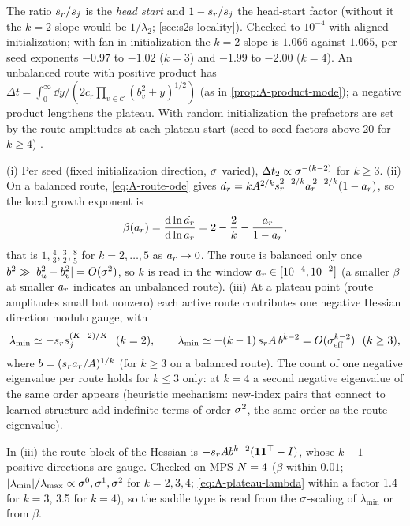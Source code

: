 The ratio $s_{r}/s_{j}$ is the \emph{head start} and $1-s_{r}/s_{j}$ the head-start factor (without it the $k=2$ slope
would be $1/\lambda_2$;
\cref{sec:s2s-locality}). Checked to $10^{-4}$ with aligned initialization; with fan-in initialization the $k=2$
slope is $1.066$ against $1.065$, per-seed exponents $-0.97$ to $-1.02$ ($k=3$) and $-1.99$ to $-2.00$ ($k=4$).
An unbalanced route with positive product has $\Delta t=\int_0^\infty\dd y/(2c_r\prod_{v\in\mathcal C}(b_v^2+y)^{1/2})$ \derived{}
(as in \cref{prop:A-product-mode}); a negative product lengthens the plateau. With random initialization the
prefactors are set by the route amplitudes at each plateau start (seed-to-seed factors above 20 for $k\ge4$) \empirical.

\begin{proposition}\label{prop:A-signatures}
  \derived{} 
  (i) Per seed (fixed initialization direction, $\sigma$ varied), $\Delta t_2\propto\sigma^{-(k-2)}$ for $k\ge3$.
  (ii) On a balanced route, \eqref{eq:A-route-ode} gives
  $\dot{a_{r}}=kA^{2/k}s_{r}^{2-2/k}a_{r}^{\,2-2/k}(1-a_{r})$, so the local growth exponent is
  \begin{equation}\label{eq:A-growth-exponent}
    \beta(a_{r})=\frac{\mathrm{d}\ln\dot{a_{r}}}{\mathrm{d}\ln a_{r}}=2-\frac2k-\frac{a_{r}}{1-a_{r}},
  \end{equation}
  that is $1,\frac43,\frac32,\frac85$ for $k=2,\dots,5$ as $a_{r}\to0$. The route is balanced only once
  $b^2\gg\lvert b_u^2-b_v^2\rvert=O(\sigma^2)$, so $k$ is read in the window $a_{r}\in[10^{-4},10^{-2}]$ (a smaller $\beta$ at
  smaller $a_{r}$ indicates an unbalanced route). (iii) At a plateau point (route amplitudes small but
  nonzero) each active route contributes one negative Hessian direction modulo gauge, with
  \begin{equation}\label{eq:A-plateau-lambda}
    \lambda_{\min}\simeq-\tw r\tw j^{(\Kc-2)/\Kc}\ \ (k=2),\qquad
    \lambda_{\min}\simeq-(k-1)\,\tw rA\,b^{k-2}=O(\isc_{\rm eff}^{k-2})\ \ (k\ge3),
  \end{equation}
  where $b=(s_{r}a_{r}/A)^{1/k}$ (for $k\ge3$ on a balanced route). The count of one negative eigenvalue
  per route holds for $k\le3$ only: at $k=4$ a second negative eigenvalue of the same order appears
  \empirical{} (heuristic mechanism: new-index pairs that connect to learned structure add indefinite terms
  of order $\sigma^2$, the same order as the route eigenvalue).
\end{proposition}
In (iii) the route block of the Hessian is $-s_{r}Ab^{k-2}(\mathbf 1\mathbf 1^{\top}-I)$, whose $k-1$ positive directions
are gauge. Checked on MPS $N=4$ ($\beta$ within $0.01$; $\lvert\lambda_{\min}\rvert/\lambda_{\max}\propto\sigma^0,\sigma^1,\sigma^2$ for $k=2,3,4$;
\eqref{eq:A-plateau-lambda} within a factor 1.4 for $k=3$, 3.5 for $k=4$), so the saddle type is read from the
$\sigma$-scaling of $\lambda_{\min}$ or from $\beta$.

